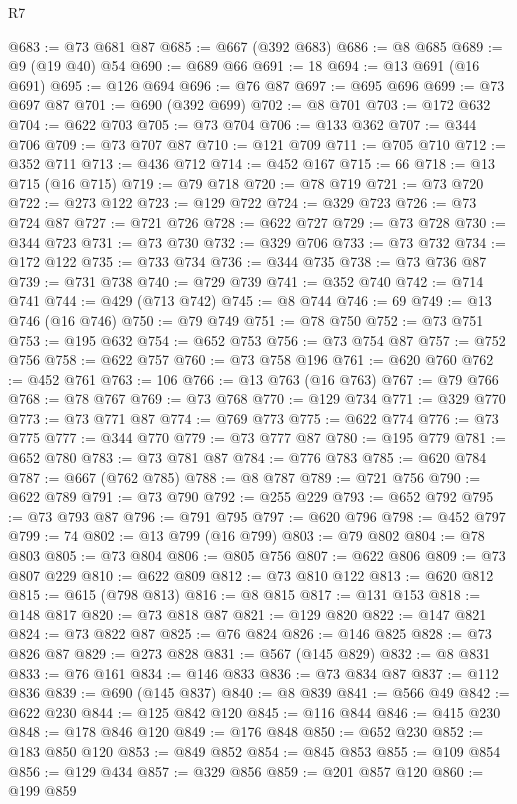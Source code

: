 \begin{lexlean}{R7}
\begin{coremodule}
@683 := @73 @681 @87
@685 := @667 (@392 @683)
@686 := @8 @685
@689 := @9 (@19 @40) @54
@690 := @689 @66
@691 := 18
@694 := @13 @691 (@16 @691)
@695 := @126 @694
@696 := @76 @87
@697 := @695 @696
@699 := @73 @697 @87
@701 := @690 (@392 @699)
@702 := @8 @701
@703 := @172 @632
@704 := @622 @703
@705 := @73 @704
@706 := @133 @362
@707 := @344 @706
@709 := @73 @707 @87
@710 := @121 @709
@711 := @705 @710
@712 := @352 @711
@713 := @436 @712
@714 := @452 @167
@715 := 66
@718 := @13 @715 (@16 @715)
@719 := @79 @718
@720 := @78 @719
@721 := @73 @720
@722 := @273 @122
@723 := @129 @722
@724 := @329 @723
@726 := @73 @724 @87
@727 := @721 @726
@728 := @622 @727
@729 := @73 @728
@730 := @344 @723
@731 := @73 @730
@732 := @329 @706
@733 := @73 @732
@734 := @172 @122
@735 := @733 @734
@736 := @344 @735
@738 := @73 @736 @87
@739 := @731 @738
@740 := @729 @739
@741 := @352 @740
@742 := @714 @741
@744 := @429 (@713 @742)
@745 := @8 @744
@746 := 69
@749 := @13 @746 (@16 @746)
@750 := @79 @749
@751 := @78 @750
@752 := @73 @751
@753 := @195 @632
@754 := @652 @753
@756 := @73 @754 @87
@757 := @752 @756
@758 := @622 @757
@760 := @73 @758 @196
@761 := @620 @760
@762 := @452 @761
@763 := 106
@766 := @13 @763 (@16 @763)
@767 := @79 @766
@768 := @78 @767
@769 := @73 @768
@770 := @129 @734
@771 := @329 @770
@773 := @73 @771 @87
@774 := @769 @773
@775 := @622 @774
@776 := @73 @775
@777 := @344 @770
@779 := @73 @777 @87
@780 := @195 @779
@781 := @652 @780
@783 := @73 @781 @87
@784 := @776 @783
@785 := @620 @784
@787 := @667 (@762 @785)
@788 := @8 @787
@789 := @721 @756
@790 := @622 @789
@791 := @73 @790
@792 := @255 @229
@793 := @652 @792
@795 := @73 @793 @87
@796 := @791 @795
@797 := @620 @796
@798 := @452 @797
@799 := 74
@802 := @13 @799 (@16 @799)
@803 := @79 @802
@804 := @78 @803
@805 := @73 @804
@806 := @805 @756
@807 := @622 @806
@809 := @73 @807 @229
@810 := @622 @809
@812 := @73 @810 @122
@813 := @620 @812
@815 := @615 (@798 @813)
@816 := @8 @815
@817 := @131 @153
@818 := @148 @817
@820 := @73 @818 @87
@821 := @129 @820
@822 := @147 @821
@824 := @73 @822 @87
@825 := @76 @824
@826 := @146 @825
@828 := @73 @826 @87
@829 := @273 @828
@831 := @567 (@145 @829)
@832 := @8 @831
@833 := @76 @161
@834 := @146 @833
@836 := @73 @834 @87
@837 := @112 @836
@839 := @690 (@145 @837)
@840 := @8 @839
@841 := @566 @49
@842 := @622 @230
@844 := @125 @842 @120
@845 := @116 @844
@846 := @415 @230
@848 := @178 @846 @120
@849 := @176 @848
@850 := @652 @230
@852 := @183 @850 @120
@853 := @849 @852
@854 := @845 @853
@855 := @109 @854
@856 := @129 @434
@857 := @329 @856
@859 := @201 @857 @120
@860 := @199 @859

\end{coremodule}
\end{lexlean}
